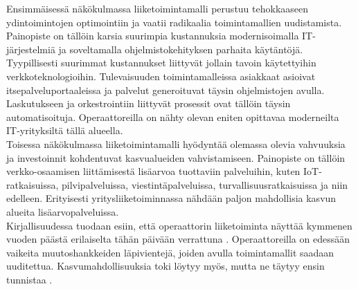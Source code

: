 \documentclass[finnish,12pt,a4paper,pdftex]{article}
\begin{document}
\noindent Ensimmäisessä näkökulmassa liiketoimintamalli perustuu tehokkaaseen ydintoimintojen optimointiin ja vaatii radikaalia toimintamallien uudistamista. Painopiste on tällöin karsia suurimpia kustannuksia modernisoimalla IT-järjestelmiä ja soveltamalla ohjelmistokehityksen parhaita käytäntöjä. Tyypillisesti suurimmat kustannukset liittyvät jollain tavoin käytettyihin verkkoteknologioihin. Tulevaisuuden toimintamalleissa asiakkaat asioivat itsepalveluportaaleissa ja palvelut generoituvat täysin ohjelmistojen avulla. Laskutukseen ja orkestrointiin liittyvät prosessit ovat tällöin täysin automatisoituja. Operaattoreilla on nähty olevan eniten opittavaa moderneilta IT-yrityksiltä tällä alueella. \citep{mckinseyope} \\

\noindent Toisessa näkökulmassa liiketoimintamalli hyödyntää olemassa olevia vahvuuksia ja investoinnit kohdentuvat kasvualueiden vahvistamiseen. Painopiste on tällöin verkko-osaamisen liittämisestä lisäarvoa tuottaviin palveluihin, kuten IoT-ratkaisuissa, pilvipalveluissa, viestintäpalveluissa, turvallisuusratkaisuissa ja niin edelleen. Erityisesti yritysliiketoiminnassa nähdään paljon mahdollisia kasvun alueita lisäarvopalveluissa. \citep{mckinseyope} \\

Kirjallisuudessa tuodaan esiin, että operaattorin liiketoiminta näyttää kymmenen vuoden päästä erilaiselta tähän päivään verrattuna \citep{mckinseytele, mckinseyope}. Operaattoreilla on edessään vaikeita muutoshankkeiden läpivientejä, joiden avulla toimintamallit saadaan uuditettua. Kasvumahdollisuuksia toki löytyy myös, mutta ne täytyy ensin tunnistaa \citep{mckinseyope}.\\




\end{document}

